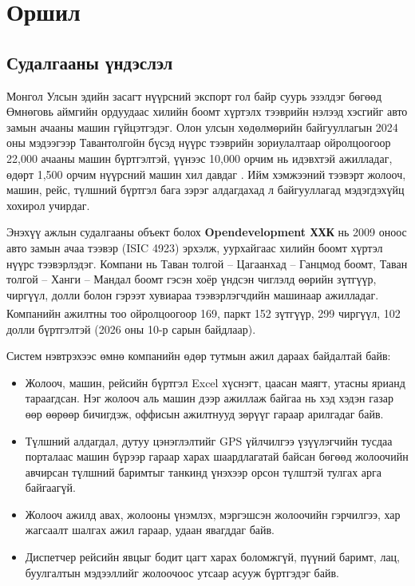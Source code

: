 \documentclass[
12pt,
oneside,
english,
onehalfspacing,
nolistspacing,
headsepline,
]{MUST-Thesis}
\newcommand{\batlah}[1]{#1\textsuperscript{\dag}}
\begin{document}
\tableofcontents
\clearpage
\listoffigures
\clearpage
\listoftables
\clearpage
\mainmatter
\pagestyle{thesis}
\myformat


\chapter{Оршил}

\section{Судалгааны үндэслэл}

Монгол Улсын эдийн засагт нүүрсний экспорт гол байр суурь эзэлдэг бөгөөд Өмнөговь аймгийн ордуудаас хилийн боомт хүртэлх тээврийн нэлээд хэсгийг авто замын ачааны машин гүйцэтгэдэг. Олон улсын хөдөлмөрийн байгууллагын 2024 оны мэдээгээр Тавантолгойн бүсэд нүүрс тээврийн зориулалтаар ойролцоогоор 22,000 ачааны машин бүртгэлтэй, үүнээс 10,000 орчим нь идэвхтэй ажилладаг, өдөрт 1,500 орчим нүүрсний машин хил давдаг \cite{ilo2024coal}. Ийм хэмжээний тээвэрт жолооч, машин, рейс, түлшний бүртгэл бага зэрэг алдагдахад л байгууллагад мэдэгдэхүйц хохирол учирдаг.

Энэхүү ажлын судалгааны объект болох \textbf{Opendevelopment ХХК} нь 2009 оноос авто замын ачаа тээвэр (ISIC 4923) эрхэлж, уурхайгаас хилийн боомт хүртэл нүүрс тээвэрлэдэг. Компани нь Таван толгой -- Цагаанхад -- Ганцмод боомт, Таван толгой -- Ханги -- Мандал боомт гэсэн хоёр үндсэн чиглэлд өөрийн зүтгүүр, чиргүүл, долли болон гэрээт хувиараа тээвэрлэгчдийн машинаар ажилладаг. Компанийн ажилтны тоо ойролцоогоор \batlah{169}, паркт \batlah{152} зүтгүүр, \batlah{299} чиргүүл, \batlah{102} долли бүртгэлтэй (2026 оны 10-р сарын байдлаар).

Систем нэвтрэхээс өмнө компанийн өдөр тутмын ажил дараах байдалтай байв:
\begin{itemize}
    \item Жолооч, машин, рейсийн бүртгэл Excel хүснэгт, цаасан маягт, утасны ярианд тараагдсан. Нэг жолооч аль машин дээр ажиллаж байгаа нь хэд хэдэн газар өөр өөрөөр бичигдэж, оффисын ажилтнууд зөрүүг гараар арилгадаг байв.
    \item Түлшний алдагдал, дутуу цэнэглэлтийг GPS үйлчилгээ үзүүлэгчийн тусдаа порталаас машин бүрээр гараар харах шаардлагатай байсан бөгөөд жолоочийн авчирсан түлшний баримтыг танкинд үнэхээр орсон түлштэй тулгах арга байгаагүй.
    \item Жолооч ажилд авах, жолооны үнэмлэх, мэргэшсэн жолоочийн гэрчилгээ, хар жагсаалт шалгах ажил гараар, удаан явагддаг байв.
    \item Диспетчер рейсийн явцыг бодит цагт харах боломжгүй, пүүний баримт, лац, буулгалтын мэдээллийг жолоочоос утсаар асууж бүртгэдэг байв.
\end{itemize}
\end{document}
